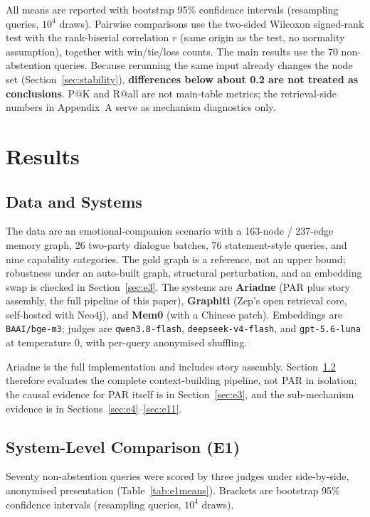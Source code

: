 \documentclass[11pt]{article}
\begin{document}
All means are reported with bootstrap 95\% confidence intervals (resampling queries, $10^4$
draws). Pairwise comparisons use the two-sided Wilcoxon signed-rank test with the
rank-biserial correlation $r$ (same origin as the test, no normality assumption), together with
win/tie/loss counts. The main results use the 70 non-abstention queries. Because rerunning the
same input already changes the node set (Section~\ref{sec:stability}), \textbf{differences below
about 0.2 are not treated as conclusions}. P@K and R@all are not main-table metrics; the
retrieval-side numbers in Appendix~A serve as mechanism diagnostics only.


\section{Results}
\label{sec:results}

\subsection{Data and Systems}
\label{sec:data}

The data are an emotional-companion scenario with a 163-node / 237-edge memory graph, 26
two-party dialogue batches, 76 statement-style queries, and nine capability categories. The gold
graph is a reference, not an upper bound; robustness under an auto-built graph, structural
perturbation, and an embedding swap is checked in Section~\ref{sec:e3}. The
systems are \textbf{Ariadne} (PAR plus story assembly, the full pipeline of this paper),
\textbf{Graphiti} (Zep's open retrieval core, self-hosted with Neo4j), and \textbf{Mem0} (with a
Chinese patch). Embeddings are \texttt{BAAI/bge-m3}; judges are
\texttt{qwen3.8-flash}, \texttt{deepseek-v4-flash}, and \texttt{gpt-5.6-luna} at temperature 0,
with per-query anonymised shuffling.

Ariadne is the full implementation and includes story assembly. Section~\ref{sec:e1} therefore
evaluates the complete context-building pipeline, not PAR in isolation; the causal evidence for
PAR itself is in Section~\ref{sec:e3}, and the sub-mechanism evidence is in
Sections~\ref{sec:e4}--\ref{sec:e11}.

\subsection{System-Level Comparison (E1)}
\label{sec:e1}

Seventy non-abstention queries were scored by three judges under side-by-side, anonymised
presentation (Table~\ref{tab:e1means}). Brackets are bootstrap 95\% confidence intervals
(resampling queries, $10^4$ draws).
\end{document}
